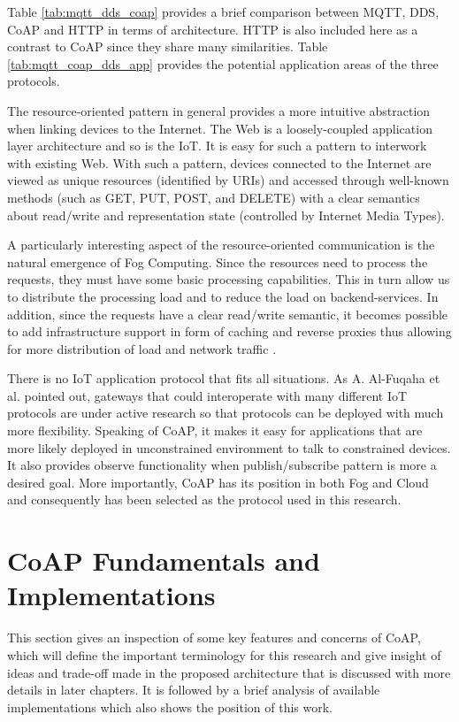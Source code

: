 Table \ref{tab:mqtt_dds_coap} provides a brief comparison between MQTT, DDS, CoAP and HTTP in terms of architecture. HTTP is also included here as a contrast to CoAP since they share many similarities. Table \ref{tab:mqtt_coap_dds_app} provides the potential application areas of the three protocols.

The resource-oriented pattern in general provides a more intuitive abstraction when linking devices to the Internet. The Web is a loosely-coupled application layer architecture \cite{6159216} and so is the IoT. It is easy for such a pattern to interwork with existing Web. With such a pattern, devices connected to the Internet are viewed as unique resources (identified by URIs) and accessed through well-known methods (such as GET, PUT, POST, and DELETE) with a clear semantics about read/write and representation state (controlled by Internet Media Types). 

A particularly interesting aspect of the resource-oriented communication is the natural emergence of Fog Computing. Since the resources need to process the requests, they must have some basic processing capabilities. This in turn allow us to distribute the processing load and to reduce the load on backend-services. In addition, since the requests have a clear read/write semantic, it becomes possible to add infrastructure support in form of caching and reverse proxies thus allowing for more distribution of load and network traffic \cite{7396558}. 

There is no IoT application protocol that fits all situations. As A. Al-Fuqaha et al. \cite{7123563} pointed out, gateways that could interoperate with many different IoT protocols are under active research so that protocols can be deployed with much more flexibility. Speaking of CoAP, it makes it easy for applications that are more likely deployed in unconstrained environment to talk to constrained devices. It also provides observe functionality when publish/subscribe pattern is more a desired goal. More importantly, CoAP has its position in both Fog and Cloud and consequently has been selected as the protocol used in this research.


\section{CoAP Fundamentals and Implementations} \label{CoAP_intro}

This section gives an inspection of some key features and concerns of CoAP, which will define the important terminology for this research and give insight of ideas and trade-off made in the proposed architecture that is discussed with more details in later chapters. It is followed by a brief analysis of available implementations which also shows the position of this work. 

